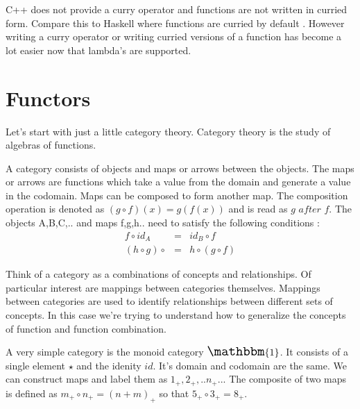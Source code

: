 \documentclass[12pt,fleqn]{article}
\begin{document}
C++ does not provide a curry operator and functions are not written in curried form. 
Compare this to Haskell where functions are curried by default \cite{lipovaca, hutton}.
However writing a curry operator or writing curried versions of a function has become a lot easier now that lambda's are supported.
\section*{Functors}

Let's start with just a little category theory.
Category theory is the study of algebras of functions.

A category consists of objects and maps or arrows between the objects.
The maps or arrows are functions which take a value from the domain and generate a value in the codomain.
Maps can be composed to form another map.
The composition operation is denoted as $(g \circ f)(x) = g(f(x))$ and is read as $g$ $after$ $f$.
The  objects A,B,C,.. and maps f,g,h.. need to satisfy the following conditions :
\begin{eqnarray*}
f \circ id_{A} &=& id_{B} \circ f \\
(h \circ g) \circ &=& h \circ (g \circ f)
\end{eqnarray*}

Think of a category as a combinations of concepts and relationships.
Of particular interest are mappings between categories themselves.
Mappings between categories are used to identify relationships between different sets of concepts.
In this case we're trying to understand how to generalize the concepts of function and function combination.


A very simple category is the monoid category $\Large \mathbbm{1}$.
It consists of a single element $\star$ and the idenity $id$.
It's domain and codomain are the same.
We can construct maps and label them as $1_+, 2_+,..n_+..$.
The composite of two maps is defined as $m_+ \circ n_+ = (n+m)_+$ so that $5_+ \circ 3_+ = 8_+$.
\end{document}
